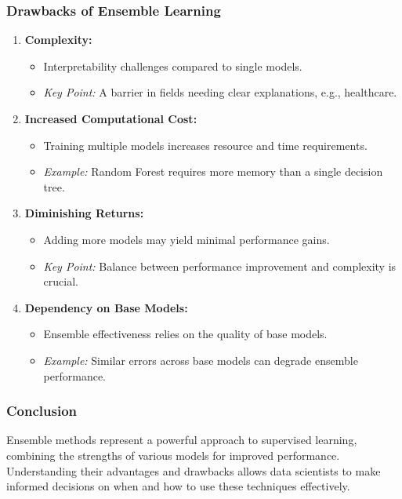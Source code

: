 \documentclass[aspectratio=169]{beamer}
\begin{document}
\begin{frame}[fragile]
  \frametitle{Drawbacks of Ensemble Learning}
  \begin{enumerate}
    \item \textbf{Complexity:}
    \begin{itemize}
      \item Interpretability challenges compared to single models.
      \item \textit{Key Point:} A barrier in fields needing clear explanations, e.g., healthcare.
    \end{itemize}

    \item \textbf{Increased Computational Cost:}
    \begin{itemize}
      \item Training multiple models increases resource and time requirements.
      \item \textit{Example:} Random Forest requires more memory than a single decision tree.
    \end{itemize}

    \item \textbf{Diminishing Returns:}
    \begin{itemize}
      \item Adding more models may yield minimal performance gains.
      \item \textit{Key Point:} Balance between performance improvement and complexity is crucial.
    \end{itemize}

    \item \textbf{Dependency on Base Models:}
    \begin{itemize}
      \item Ensemble effectiveness relies on the quality of base models.
      \item \textit{Example:} Similar errors across base models can degrade ensemble performance.
    \end{itemize}
  \end{enumerate}
\end{frame}

\begin{frame}[fragile]
  \frametitle{Conclusion}
  Ensemble methods represent a powerful approach to supervised learning, combining the strengths of various models for improved performance. Understanding their advantages and drawbacks allows data scientists to make informed decisions on when and how to use these techniques effectively.
\end{frame}
\end{document}

